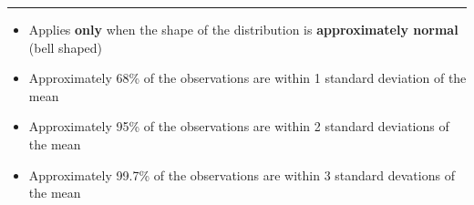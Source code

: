 \documentclass{report}
\begin{document}
\bigbreak \noindent \bigbreak \noindent
\hrule
\bigbreak \noindent
{}
\begin{itemize}
  \item Applies \textbf{only} when the shape of the distribution is \textbf{approximately normal} (bell shaped)
  \item Approximately 68\% of the observations are within 1 standard deviation of the mean
  \item Approximately 95\% of the observations are within 2 standard deviations of the mean
  \item Approximately 99.7\% of the observations are within 3 standard devations of the mean
\end{itemize}
\bigbreak \noindent \bigbreak \noindent
{}
\bigbreak \noindent
\end{document}
